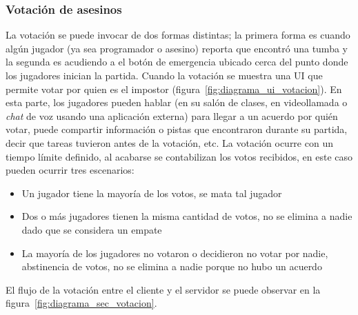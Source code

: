 \subsubsection{Votación de asesinos}
La votación se puede invocar de dos formas distintas; la primera forma es cuando algún jugador (ya sea programador o asesino) reporta que encontró una tumba y la segunda es acudiendo a el botón de emergencia ubicado cerca del punto donde los jugadores inician la partida. Cuando la votación se muestra una UI que permite votar por quien es el impostor (figura~\ref{fig:diagrama_ui_votacion}). En esta parte, los jugadores pueden hablar (en su salón de clases, en videollamada o \textit{chat} de voz usando una aplicación externa) para llegar a un acuerdo por quién votar, puede compartir información o pistas que encontraron durante su partida, decir que tareas tuvieron antes de la votación, etc. La votación ocurre con un tiempo límite definido, al acabarse se contabilizan los votos recibidos, en este caso pueden ocurrir tres escenarios:
\begin{itemize}
    \item Un jugador tiene la mayoría de los votos, se mata tal jugador
    \item Dos o más jugadores tienen la misma cantidad de votos, no se elimina a nadie dado que se considera un empate
    \item La mayoría de los jugadores no votaron o decidieron no votar por nadie, abstinencia de votos, no se elimina a nadie porque no hubo un acuerdo
\end{itemize}
El flujo de la votación entre el cliente y el servidor se puede observar en la figura~\ref{fig:diagrama_sec_votacion}.

